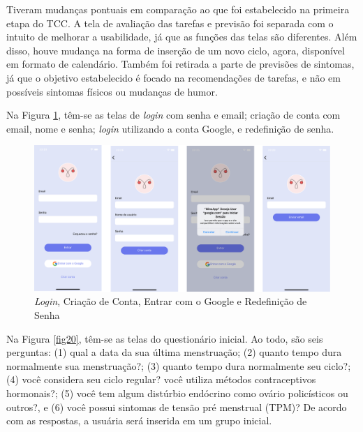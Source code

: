 Tiveram mudanças pontuais em comparação ao que foi estabelecido na primeira etapa do TCC. A tela de avaliação das tarefas e 
previsão foi separada com o intuito de melhorar a usabilidade, já que as funções das telas são diferentes.
Além disso, houve mudança na forma de inserção de um novo ciclo, agora, disponível em formato de calendário. 
Também foi retirada a parte de previsões de sintomas, já que o objetivo estabelecido é focado na recomendações de 
tarefas, e não em possíveis sintomas físicos ou mudanças de humor.

Na Figura \ref{fig19}, têm-se as telas de \emph{login} com senha e email; criação de conta com email, nome e senha; 
\emph{login} utilizando a conta Google, e redefinição de senha.

\begin{figure}[htbp]
	\caption{\emph{Login}, Criação de Conta, Entrar com o Google e Redefinição de Senha}
	\begin{center}
	\includegraphics[keepaspectratio=true,scale=0.08]{figuras/aplicativo1.png}
	\end{center}
    \label{fig19}
\end{figure}

Na Figura \ref{fig20}, têm-se as telas do questionário inicial. Ao todo, são seis perguntas: (1) qual a data da sua 
última menstruação; (2) quanto tempo dura normalmente sua menstruação?; (3) quanto tempo dura normalmente seu ciclo?;
(4) você considera seu ciclo regular? você utiliza métodos contraceptivos hormonais?; (5) você tem algum distúrbio 
endócrino como ovário policísticos ou outros?, e (6) você possui sintomas de tensão pré menstrual (TPM)? 
De acordo com as respostas, a usuária será inserida em um grupo inicial.

